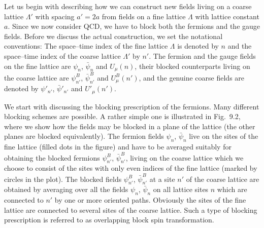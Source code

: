Let us begin with describing how we can construct new fields living on a
coarse lattice $\Lambda'$ with spacing $a' = 2a$ from fields on a fine lattice
$\Lambda$ with lattice constant $a$. Since we now consider QCD, we have to
block both the fermions and the gauge fields. Before we discuss the actual
construction, we set the notational conventions: The space--time index of the
fine lattice $\Lambda$ is denoted by $n$ and the space--time index of the
coarse lattice $\Lambda'$ by $n'$. The fermion and the gauge fields on the
fine lattice are $\psi_n$, $\bar\psi_n$ and $U_\mu(n)$, their blocked
counterparts living on the coarse lattice are $\psi^B_{n'}$, $\bar\psi^B_{n'}$
and $U^B_\mu(n')$, and the genuine coarse fields are denoted by $\psi'_{n'}$,
$\bar\psi'_{n'}$ and $U'_\mu(n')$.

We start with discussing the blocking prescription of the fermions. Many
different blocking schemes are possible. A rather simple one is illustrated in
Fig.~9.2, where we show how the fields may be blocked in a plane of the
lattice (the other planes are blocked equivalently). The fermion fields
$\psi_n$, $\bar\psi_n$ live on the sites of the fine lattice (filled dots in
the figure) and have to be averaged suitably for obtaining the blocked
fermions $\psi^B_{n'}$, $\bar\psi^B_{n'}$, living on the coarse lattice which
we choose to consist of the sites with only even indices of the fine lattice
(marked by circles in the plot). The blocked fields $\psi^B_{n'}$,
$\bar\psi^B_{n'}$ at a site $n'$ of the coarse lattice are obtained by
averaging over all the fields $\psi_n$, $\bar\psi_n$ on all lattice sites $n$
which are connected to $n'$ by one or more oriented paths. Obviously the sites
of the fine lattice are connected to several sites of the coarse lattice. Such
a type of blocking prescription is referred to as overlapping block spin
transformation.


